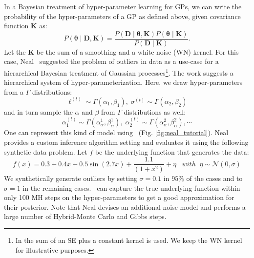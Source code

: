 In a Bayesian treatment of  hyper-parameter learning for \ac{GP}s,
we can write the probability of the hyper-parameters of a GP as
defined above, given covariance function $\mathbf{K}$ as:
\begin{equation}
\label{eq:hyperProbability}
P(\bm{\theta} \mid \mathbf{D,K}) = \frac{P(\mathbf{D} \mid \bm{\theta}, \mathbf{K})P(\bm{\theta} \mid  \mathbf{K})}{P(\mathbf{D} \mid \mathbf{K})}.
\end{equation}
Let the $\mathbf{K}$ be the sum of a smoothing and a white noise (WN) kernel. For this case, Neal~\citeyearpar{neal1997monte} suggested the problem of outliers in data as a use-case for a hierarchical Bayesian treatment of Gaussian processes\footnote{In \citep{neal1997monte} the sum of an SE plus a constant kernel is used. We keep the WN kernel for illustrative purposes.}. The work suggests a hierarchical system of hyper-parameterization. Here, we draw hyper-parameters from a $\Gamma$ distributions:
\begin{equation}
\label{eq:hyper-ell}
\ell^{(t)} \sim \Gamma(\alpha_1,\beta_1),\;\sigma^{(t)} \sim \Gamma(\alpha_2,\beta_2)
\end{equation} 
and in turn sample the $\alpha$ and $\beta$ from $\Gamma$ distributions as well:
\begin{equation}
\label{eq:hyper-alpha}
\alpha_1^{(t)} \sim \Gamma(\alpha^1_{\alpha},\beta^1_{ \alpha } ),\; \alpha_2^{(t)} \sim \Gamma(\alpha^2_{\alpha},\beta^2_{\alpha}),\cdots
\end{equation}
One can represent this kind of model using \gpmem\ (Fig. \ref{fig:neal_tutorial}).
Neal provides a custom inference algorithm setting and evaluates it using the following synthetic data problem. Let $f$ be the underlying function that generates the data:
\begin{equation}
f(x) =  0.3 + 0.4 x + 0.5 \sin(2.7x) + \frac{1.1}{(1+ x^2)} + \eta \;\;\; with\;\;\eta \sim \mathcal{N}(0,\sigma)
\end{equation}
We synthetically generate outliers by setting $\sigma = 0.1$ in $95\%$ of the cases and to $\sigma = 1$ in the remaining cases. \gpmem\  can capture the true underlying function within only 100 MH steps on the hyper-parameters to get a good approximation for their posterior. Note that Neal devises an additional noise model and performs a large number of Hybrid-Monte Carlo and Gibbs steps.  
